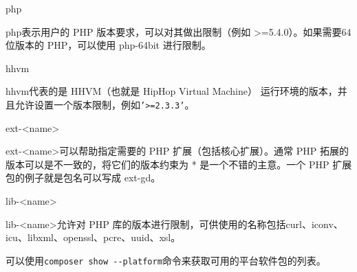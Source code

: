 \begin{compactitem}
\item php

php表示用户的 PHP 版本要求，可以对其做出限制（例如 >=5.4.0）。如果需要64位版本的 PHP，可以使用 php-64bit 进行限制。

\item hhvm

hhvm代表的是 HHVM（也就是 HipHop Virtual Machine） 运行环境的版本，并且允许设置一个版本限制，例如\texttt{'>=2.3.3'}。

\item ext-<name>

ext-<name>可以帮助指定需要的 PHP 扩展（包括核心扩展）。通常 PHP 拓展的版本可以是不一致的，将它们的版本约束为 * 是一个不错的主意。一个 PHP 扩展包的例子就是包名可以写成 ext-gd。

\item lib-<name>

lib-<name>允许对 PHP 库的版本进行限制，可供使用的名称包括curl、iconv、icu、libxml、openssl、pcre、uuid、xsl。
\end{compactitem}

可以使用\texttt{composer show -\/-platform}命令来获取可用的平台软件包的列表。


